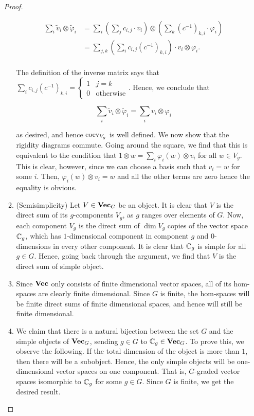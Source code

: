 \documentclass{article}
\theoremstyle{definition}
\numberwithin{figure}{section}
\begin{document}
\begin{enumerate}[\thesection .1.]
\begin{proof}
\begin{enumerate}
\begin{align*}
\sum_{i}\tilde{v}_i\otimes \tilde{\varphi}_i&=\sum_{i}\left(\sum_{j}c_{i,j}\cdot v_i\right)\otimes \left(\sum_{k}(c^{-1})_{k,i}\cdot \varphi_i\right)\\
&=\sum_{j,k} \left(\sum_{i}c_{i,j}(c^{-1})_{k,i}\right)\cdot v_i\otimes \varphi_i.\\
\end{align*}

The definition of the inverse matrix says that $\sum_{i}c_{i,j}(c^{-1})_{k,i}=\begin{cases}1 & j=k \\ 0 &\text{otherwise}\end{cases}$. Hence, we conclude that

$$\sum_{i}\tilde{v}_i\otimes \tilde{\varphi}_i=\sum_{i}v_i\otimes \varphi_i$$

as desired, and hence $\mathrm{coev}_{V_g}$ is well defined. We now show that the rigidity diagrams commute. Going around the square, we find that this is equivalent to the condition that $1\otimes w=\sum_{i}\varphi_i(w)\otimes v_i$ for all $w\in V_g$. This is clear, however, since we can choose a basis such that $v_i=w$ for some $i$. Then, $\varphi_i(w)\otimes v_i=w$ and all the other terms are zero hence the equality is obvious.

\item (Semisimplicity) Let $V\in \bold{Vec}_G$ be an object. It is clear that $V$ is the direct sum of its $g$-components $V_g$, as $g$ ranges over elements of $G$. Now, each component $V_g$ is the direct sum of $\dim V_g$ copies of the vector space $\mathbb{C}_g$, which has $1$-dimensional component in component $g$ and $0$-dimensions in every other component. It is clear that $\mathbb{C}_g$ is simple for all $g\in G$. Hence, going back through the argument, we find that $V$ is the direct sum of simple object.

\item Since $\bold{Vec}$ only consists of finite dimensional vector spaces, all of its hom-spaces are clearly finite dimensional. Since $G$ is finite, the hom-spaces will be finite direct sums of finite dimensional spaces, and hence will still be finite dimensional.

\item We claim that there is a natural bijection between the set $G$ and the simple objects of $\bold{Vec}_G$, sending $g\in G$ to $\mathbb{C}_g\in \bold{Vec}_G$. To prove this, we observe the following. If the total dimension of the object is more than $1$, then there will be a subobject. Hence, the only simple objects will be one-dimensional vector spaces on one component. That is, $G$-graded vector spaces isomorphic to $\mathbb{C}_g$ for some $g\in G$. Since $G$ is finite, we get the desired result.


\end{enumerate}
\end{proof}
\end{enumerate}
\end{document}

